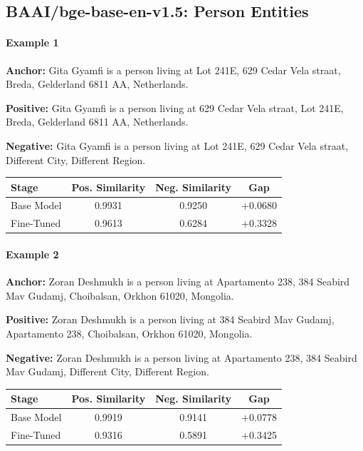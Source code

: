 \documentclass{article}
\begin{document}

\subsection{BAAI/bge-base-en-v1.5: Person Entities}

\paragraph{Example 1}

\textbf{Anchor:} Gita Gyamfi is a person living at Lot 241E, 629 Cedar Vela straat, Breda, Gelderland 6811 AA, Netherlands.

\textbf{Positive:} Gita Gyamfi is a person living at 629 Cedar Vela straat, Lot 241E, Breda, Gelderland 6811 AA, Netherlands.

\textbf{Negative:} Gita Gyamfi is a person living at Lot 241E, 629 Cedar Vela straat, Different City, Different Region.

\begin{center}
\small
\begin{tabular}{lccc}
\toprule
Stage & Pos. Similarity & Neg. Similarity & Gap \\
\midrule
Base Model & 0.9931 & 0.9250 & +0.0680 \\
Fine-Tuned & 0.9613 & 0.6284 & +0.3328 \\
\bottomrule
\end{tabular}
\end{center}

\paragraph{Example 2}

\textbf{Anchor:} Zoran Deshmukh is a person living at Apartamento 238, 384 Seabird Mav Gudamj, Choibalsan, Orkhon 61020, Mongolia.

\textbf{Positive:} Zoran Deshmukh is a person living at 384 Seabird Mav Gudamj, Apartamento 238, Choibalsan, Orkhon 61020, Mongolia.

\textbf{Negative:} Zoran Deshmukh is a person living at Apartamento 238, 384 Seabird Mav Gudamj, Different City, Different Region.

\begin{center}
\small
\begin{tabular}{lccc}
\toprule
Stage & Pos. Similarity & Neg. Similarity & Gap \\
\midrule
Base Model & 0.9919 & 0.9141 & +0.0778 \\
Fine-Tuned & 0.9316 & 0.5891 & +0.3425 \\
\bottomrule
\end{tabular}
\end{center}
\end{document}
